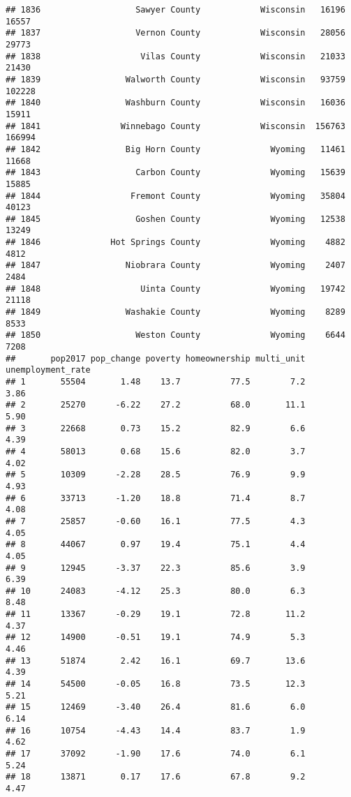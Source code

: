 \documentclass[
]{article}
\begin{document}
\begin{verbatim}
## 1836                   Sawyer County            Wisconsin   16196   16557
## 1837                   Vernon County            Wisconsin   28056   29773
## 1838                    Vilas County            Wisconsin   21033   21430
## 1839                 Walworth County            Wisconsin   93759  102228
## 1840                 Washburn County            Wisconsin   16036   15911
## 1841                Winnebago County            Wisconsin  156763  166994
## 1842                 Big Horn County              Wyoming   11461   11668
## 1843                   Carbon County              Wyoming   15639   15885
## 1844                  Fremont County              Wyoming   35804   40123
## 1845                   Goshen County              Wyoming   12538   13249
## 1846              Hot Springs County              Wyoming    4882    4812
## 1847                 Niobrara County              Wyoming    2407    2484
## 1848                    Uinta County              Wyoming   19742   21118
## 1849                 Washakie County              Wyoming    8289    8533
## 1850                   Weston County              Wyoming    6644    7208
##       pop2017 pop_change poverty homeownership multi_unit unemployment_rate
## 1       55504       1.48    13.7          77.5        7.2              3.86
## 2       25270      -6.22    27.2          68.0       11.1              5.90
## 3       22668       0.73    15.2          82.9        6.6              4.39
## 4       58013       0.68    15.6          82.0        3.7              4.02
## 5       10309      -2.28    28.5          76.9        9.9              4.93
## 6       33713      -1.20    18.8          71.4        8.7              4.08
## 7       25857      -0.60    16.1          77.5        4.3              4.05
## 8       44067       0.97    19.4          75.1        4.4              4.05
## 9       12945      -3.37    22.3          85.6        3.9              6.39
## 10      24083      -4.12    25.3          80.0        6.3              8.48
## 11      13367      -0.29    19.1          72.8       11.2              4.37
## 12      14900      -0.51    19.1          74.9        5.3              4.46
## 13      51874       2.42    16.1          69.7       13.6              4.39
## 14      54500      -0.05    16.8          73.5       12.3              5.21
## 15      12469      -3.40    26.4          81.6        6.0              6.14
## 16      10754      -4.43    14.4          83.7        1.9              4.62
## 17      37092      -1.90    17.6          74.0        6.1              5.24
## 18      13871       0.17    17.6          67.8        9.2              4.47

\end{verbatim}
\end{document}
